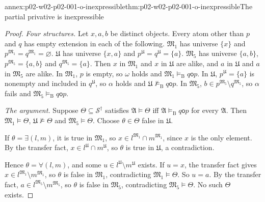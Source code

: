 \begin{annexitem}{annex:p02-w02-p02-001-o-inexpressible}{thm:p02-w02-p02-001-o-inexpressible}{The partial privative is inexpressible}
\begin{proof}
\emph{Four structures.} Let \(x,a,b\) be distinct objects. Every atom other
than \(p\) and \(q\) has empty extension in each of the following.
\(\mathfrak M_1\) has universe \(\{x\}\) and
\(p^{\mathfrak M_1}=q^{\mathfrak M_1}=\varnothing\).
\(\mathfrak U\) has universe \(\{x,a\}\) and
\(p^{\mathfrak U}=q^{\mathfrak U}=\{a\}\).
\(\mathfrak M_5\) has universe \(\{a,b\}\), \(p^{\mathfrak M_5}=\{a,b\}\)
and \(q^{\mathfrak M_5}=\{a\}\).
Then \(x\) in \(\mathfrak M_1\) and \(x\) in \(\mathfrak U\) are alike, and
\(a\) in \(\mathfrak U\) and \(a\) in \(\mathfrak M_5\) are alike.
In \(\mathfrak M_1\), \(p\) is empty, so \(\omega\) holds and
\(\mathfrak M_1\models_{\mathrm B}q\mathbin{\mathsf o}p\).
In \(\mathfrak U\), \(p^{\mathfrak U}=\{a\}\) is nonempty and included in
\(q^{\mathfrak U}\), so \(\alpha\) holds and
\(\mathfrak U\not\models_{\mathrm B}q\mathbin{\mathsf o}p\).
In \(\mathfrak M_5\), \(b\in p^{\mathfrak M_5}\setminus q^{\mathfrak M_5}\),
so \(\alpha\) fails and
\(\mathfrak M_5\models_{\mathrm B}q\mathbin{\mathsf o}p\).

\emph{The argument.} Suppose \(\Theta\subseteq\mathcal S^\dagger\) satisfies
\(\mathfrak A\models\Theta\) iff \(\mathfrak A\models_{\mathrm B}q\mathbin{\mathsf o}p\)
for every \(\mathfrak A\). Then \(\mathfrak M_1\models\Theta\),
\(\mathfrak U\not\models\Theta\) and \(\mathfrak M_5\models\Theta\). Choose
\(\theta\in\Theta\) false in \(\mathfrak U\).

If \(\theta=\exists(l,m)\), it is true in \(\mathfrak M_1\), so
\(x\in l^{\mathfrak M_1}\cap m^{\mathfrak M_1}\), since \(x\) is the only
element. By the transfer fact, \(x\in l^{\mathfrak U}\cap m^{\mathfrak U}\),
so \(\theta\) is true in \(\mathfrak U\), a contradiction.

Hence \(\theta=\forall(l,m)\), and some \(u\in l^{\mathfrak U}\setminus m^{\mathfrak U}\)
exists. If \(u=x\), the transfer fact gives
\(x\in l^{\mathfrak M_1}\setminus m^{\mathfrak M_1}\), so \(\theta\) is false
in \(\mathfrak M_1\), contradicting \(\mathfrak M_1\models\Theta\). So \(u=a\).
By the transfer fact, \(a\in l^{\mathfrak M_5}\setminus m^{\mathfrak M_5}\),
so \(\theta\) is false in \(\mathfrak M_5\), contradicting
\(\mathfrak M_5\models\Theta\). No such \(\Theta\) exists.
\end{proof}
\end{annexitem}

